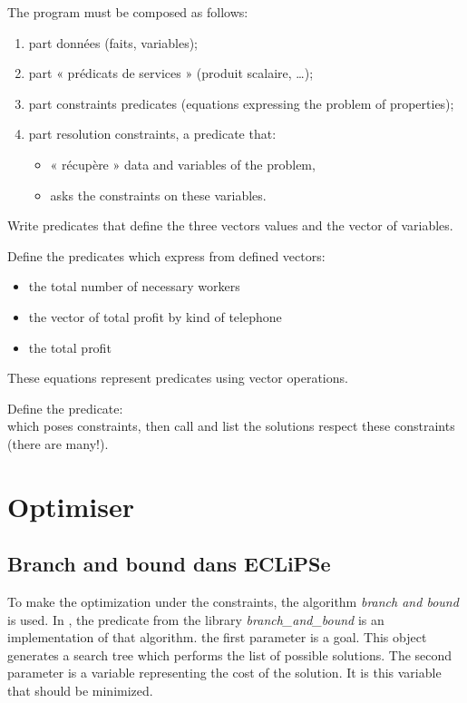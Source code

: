 \noindent The program must be composed as follows:

\begin{enumerate}
\item part données (faits, variables);
\item part « prédicats de services » (produit scalaire, \dots);
\item part constraints predicates (equations expressing the problem of properties);
\item part resolution constraints, a predicate that:
    \begin{itemize}
    \item « récupère » data and variables of the problem,
    \item asks the constraints on these variables.
    \end{itemize}
\end{enumerate}

\begin{question} \label{TPCPC_Qdeb} 
  Write predicates that define the three vectors
   values and the vector of variables.
\end{question}

\begin{question}
 Define the predicates which express from
   defined vectors:
\begin{itemize} 
  \item the total number of necessary workers
  \item the vector of total profit by kind of telephone
  \item the total profit
\end{itemize} 
These equations represent predicates using vector operations.
\end{question}

\begin{question}
 Define the predicate: \\
   which
   poses constraints, then call and list the solutions
   respect these constraints (there are many!).
\end{question}


\section{Optimiser}

\subsection{Branch and bound dans ECLiPSe}
To make the optimization under the constraints, the algorithm \emph{branch and bound} is used. 
\newpage
In \eclipse{}, the predicate  from the library
\emph{branch\_and\_bound} is an implementation of that algorithm. the
first parameter is a goal. This object generates a search tree which performs
the list of possible solutions. The second parameter is a variable representing the
cost of the solution. It is this variable that should be minimized. 

